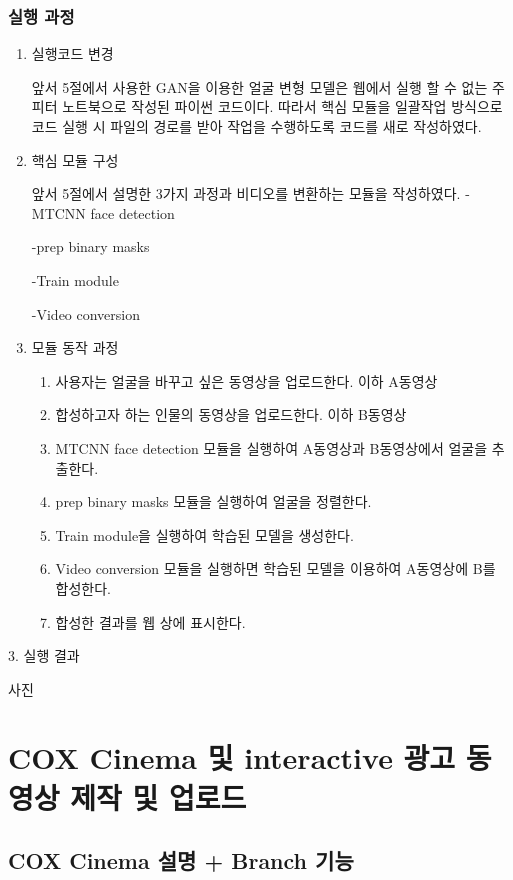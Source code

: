 \documentclass[chapter,oneside]{oblivoir}
\begin{document}
\subsection{실행 과정}
\begin{enumerate}%

    \item 실행코드 변경

    앞서 5절에서 사용한 GAN을 이용한 얼굴 변형 모델\cite{reference13}은 웹에서 실행 할 수 없는 주피터 노트북으로 작성된 파이썬 코드이다. 따라서 핵심 모듈을 일괄작업 방식으로 코드 실행 시 파일의 경로를 받아 작업을 수행하도록 코드를 새로 작성하였다.

    \item 핵심 모듈 구성

    앞서 5절에서 설명한 3가지 과정과 비디오를 변환하는 모듈을 작성하였다.
    -MTCNN face detection


    -prep binary masks

    -Train module

    -Video conversion

    \item 모듈 동작 과정
    \begin{enumerate}
        \item  사용자는 얼굴을 바꾸고 싶은 동영상을 업로드한다. 이하 A동영상
        \item 합성하고자 하는 인물의 동영상을 업로드한다. 이하 B동영상
        \item MTCNN face detection 모듈을 실행하여 A동영상과 B동영상에서 얼굴을 추출한다.
        \item prep binary masks 모듈을 실행하여 얼굴을 정렬한다.
        \item Train module을 실행하여 학습된 모델을 생성한다.
        \item Video conversion 모듈을 실행하면 학습된 모델을 이용하여 A동영상에 B를 합성한다.
        \item 합성한 결과를 웹 상에 표시한다.
    \end{enumerate}

\end{enumerate}
3. 실행 결과

사진

\chapter{ COX Cinema 및 interactive 광고 동영상 제작 및 업로드}

\section{ COX Cinema 설명 + Branch 기능}
\end{document}
